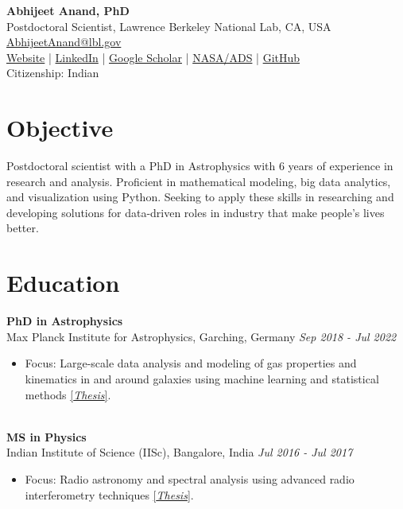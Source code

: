 \documentclass[a4paper,10pt]{article}
\begin{document}
\begin{center}
    {\LARGE \textbf{Abhijeet Anand, PhD}} \\
    Postdoctoral Scientist, Lawrence Berkeley National Lab, CA, USA \\
    \href{mailto:AbhijeetAnand@lbl.gov}{AbhijeetAnand@lbl.gov} \\
     \href{https://abhi0395.github.io/}{Website}  | \href{https://www.linkedin.com/in/abhijeet-anand-iisc}{LinkedIn} | \href{https://scholar.google.com/citations?hl=en&user=MfOuq1IAAAAJ}{Google Scholar} | \href{https://ui.adsabs.harvard.edu/public-libraries/YPXGQEsNQg-zR9R9YBYFXw}{NASA/ADS} | \href{https://github.com/abhi0395}{GitHub}\\
    Citizenship: Indian\\
\end{center}

\vspace{0.5cm}

\section*{Objective}
Postdoctoral scientist with a PhD in Astrophysics with 6 years of experience in research and analysis.
Proficient in mathematical modeling, big data analytics, and visualization using Python. Seeking to
apply these skills in researching and developing solutions for data-driven roles in industry that make people’s lives better.

\section*{Education}
\noindent
\textbf{PhD in Astrophysics} \\
Max Planck Institute for Astrophysics, Garching, Germany \hfill \textit{Sep 2018 - Jul 2022} \\
\begin{itemize}[noitemsep, topsep=0pt]
    \item Focus: Large-scale data analysis and modeling of gas properties and kinematics in and around galaxies using machine learning and statistical methods \href{https://edoc.ub.uni-muenchen.de/30337/}{[\textit{Thesis}]}.
\end{itemize}

\noindent\\
\textbf{MS in Physics} \\
Indian Institute of Science (IISc), Bangalore, India \hfill \textit{Jul 2016 - Jul 2017} \\
\begin{itemize}[noitemsep, topsep=0pt]
    \item Focus: Radio astronomy and spectral analysis using advanced radio interferometry techniques \href{https://raw.githubusercontent.com/abhi0395/mycv/main/files/MS_thesis.pdf}{[\textit{Thesis}]}.
\end{itemize}
\end{document}
